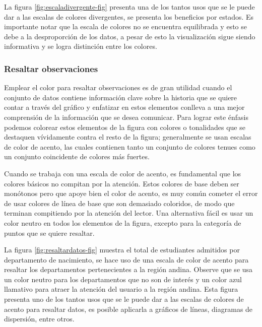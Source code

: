 \documentclass[
]{book}
\begin{document}
La figura \ref{fig:escaladivergente-fig} presenta una de los tantos usos que se le puede dar a las escalas de colores divergentes, se presenta los beneficios por estados. Es importante notar que la escala de colores no se encuentra equilibrada y esto se debe a la desproporción de los datos, a pesar de esto la visualización sigue siendo informativa y se logra distinción entre los colores.

\hypertarget{resaltar-observaciones}{%
\subsubsection{Resaltar observaciones}\label{resaltar-observaciones}}

Emplear el color para resaltar observaciones es de gran utilidad cuando el conjunto de datos contiene información clave sobre la historia que se quiere contar a través del gráfico y enfatizar en estos elementos conlleva a una mejor comprensión de la información que se desea comunicar. Para lograr este énfasis podemos colorear estos elementos de la figura con colores o tonalidades que se destaquen vívidamente contra el resto de la figura; generalmente se usan escalas de color de acento, las cuales contienen tanto un conjunto de colores tenues como un conjunto coincidente de colores más fuertes.

Cuando se trabaja con una escala de color de acento, es fundamental que los colores básicos no compitan por la atención. Estos colores de base deben ser monótonos pero que apoye bien el color de acento, es muy común cometer el error de usar colores de línea de base que son demasiado coloridos, de modo que terminan compitiendo por la atención del lector. Una alternativa fácil es usar un color neutro en todos los elementos de la figura, excepto para la categoría de puntos que se quiere resaltar.

La figura \ref{fig:resaltardatos-fig} muestra el total de estudiantes admitidos por departamento de nacimiento, se hace uso de una escala de color de acento para resaltar los departamentos pertenecientes a la región andina. Observe que se usa un color neutro para los departamentos que no son de interés y un color azul llamativo para atraer la atención del usuario a la región andina. Esta figura presenta uno de los tantos usos que se le puede dar a las escalas de colores de acento para resaltar datos, es posible aplicarla a gráficos de líneas, diagramas de dispersión, entre otros.
\end{document}
